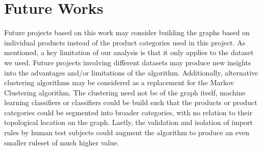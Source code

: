 \section{Future Works}
Future projects based on this work may consider building the graphs based on individual products instead of the product categories used in this project. As mentioned, a key limitation of our analysis is that it only applies to the dataset we used. Future projects involving different datasets may produce new insights into the advantages and/or limitations of the algorithm. Additionally, alternative clustering algorithms may be considered as a replacement for the Markov Clustering algorithm. The clustering need not be of the graph itself, machine learning classifiers or classifiers could be build such that the products or product categories could be segmented into broader categories, with no relation to their topological location on the graph. Lastly, the validation and isolation of import rules by human test subjects could augment the algorithm to produce an even smaller ruleset of much higher value.

